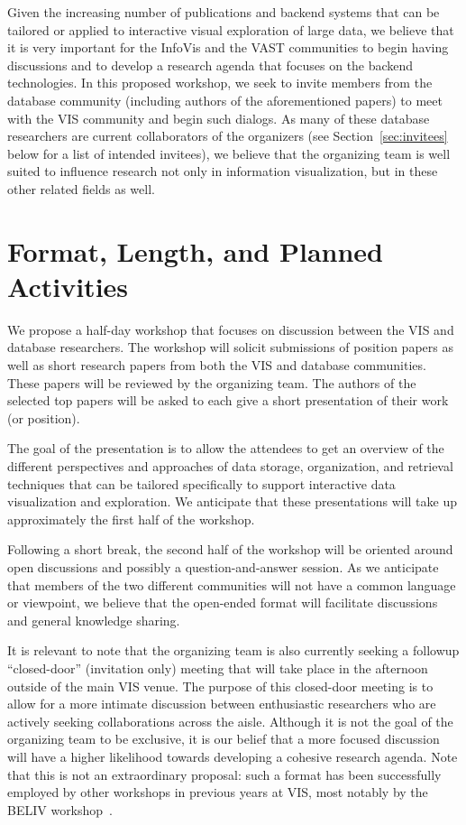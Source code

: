 \documentclass[journal]{vgtc}                %
\begin{document}
Given the increasing number of publications and backend systems that
can be tailored or applied to interactive visual exploration of large
data, we believe that it is very important for the InfoVis and the
VAST communities to begin having discussions and to develop a research
agenda that focuses on the backend technologies. In this proposed
workshop, we seek to invite members from the database community
(including authors of the aforementioned papers) to meet with the VIS
community and begin such dialogs. As many of these database
researchers are current collaborators of the organizers (see Section~\ref{sec:invitees} below for a list of intended invitees), we believe that the
organizing team is well suited to influence research not only in
information visualization, but in these other related fields as well.

\section{Format, Length, and Planned Activities}
We propose a half-day workshop that focuses on discussion between the
VIS and database researchers. The workshop will solicit submissions of
position papers as well as short research papers from both the VIS and
database communities. These papers will be reviewed by the organizing
team. The authors of the selected top papers will be asked to each
give a short presentation of their work (or position).

The goal of the presentation is to allow the attendees to get an
overview of the different perspectives and approaches of data storage,
organization, and retrieval techniques that can be tailored
specifically to support interactive data visualization and
exploration. We anticipate that these presentations will take up
approximately the first half of the workshop.

Following a short break, the second half of the workshop will be
oriented around open discussions and possibly a question-and-answer
session. As we anticipate that members of the two different
communities will not have a common language or viewpoint, we believe
that the open-ended format will facilitate discussions and general
knowledge sharing.

It is relevant to note that the organizing team is also currently
seeking a followup ``closed-door'' (invitation only) meeting that will
take place in the afternoon outside of the main VIS venue. The purpose
of this closed-door meeting is to allow for a more intimate discussion
between enthusiastic researchers who are actively seeking
collaborations across the aisle. Although it is not the goal of the
organizing team to be exclusive, it is our belief that a more focused
discussion will have a higher likelihood towards developing a cohesive
research agenda. Note that this is not an extraordinary proposal: such
a format has been successfully employed by other workshops in previous
years at VIS, most notably by the BELIV workshop~.
\end{document}
